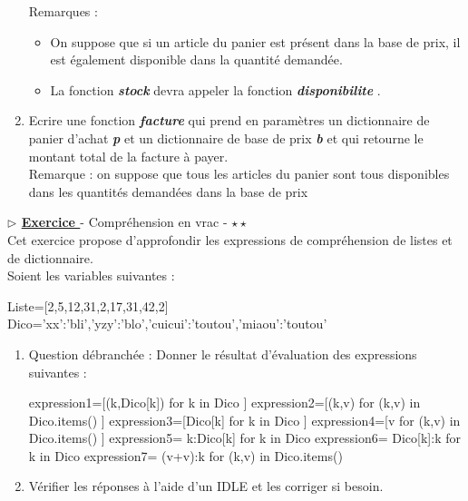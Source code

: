 \documentclass[12pt,french]{article}
\newcounter{npb}
\newcommand{\exo}{
    \stepcounter{npb}
    {\textbf{$\triangleright$ \underline{Exercice \arabic{npb} }}}
}
\begin{document}
\begin{enumerate}
	Remarques :
	\begin{itemize}
	\item On suppose que si un article du panier est présent dans la base de prix, il est également disponible dans la quantité demandée.
	\item La fonction \textbf{\textsl{stock}} devra appeler la fonction \textbf{\textsl{disponibilite}} .
	\end{itemize}
\item Ecrire une fonction \textbf{\textsl{facture}} qui prend en paramètres un dictionnaire de panier d'achat \textbf{\textsl{p}} et un dictionnaire de base de prix \textbf{\textsl{b}} et qui retourne le montant total de la facture à payer.\\
Remarque : on suppose que tous les articles du panier sont tous disponibles dans les quantités demandées dans la base de prix 
\end{enumerate}
\exo - Compréhension en vrac - $\star \star $\\
Cet exercice propose d'approfondir les expressions de compréhension de listes et de dictionnaire.\\
Soient les variables suivantes :\\
\begin{tcolorbox}[enhanced,colback=blue!5!white,colframe=blue!75!black]	
\begin{pyverbatim}
Liste=[2,5,12,31,2,17,31,42,2]
Dico={'xx':'bli','yzy':'blo','cuicui':'toutou','miaou':'toutou'}
\end{pyverbatim}
\end{tcolorbox}
\begin{enumerate}
	\item Question débranchée : Donner le résultat d'évaluation des expressions suivantes :\\
	\begin{tcolorbox}[enhanced,colback=blue!5!white,colframe=blue!75!black]	
	\begin{pyverbatim}
	expression1=[(k,Dico[k]) for k in Dico ]
	expression2=[(k,v) for (k,v) in Dico.items() ]
	expression3=[Dico[k] for k in Dico ]
	expression4=[v for (k,v) in Dico.items() ]
	expression5={ k:Dico[k] for k in Dico }
	expression6={ Dico[k]:k for k in Dico }
	expression7={ (v+v):k for (k,v) in Dico.items() }
	\end{pyverbatim}
	\end{tcolorbox}	
	\item Vérifier les réponses à l'aide d'un IDLE et les corriger si besoin. 
	
\end{enumerate}
\end{document}
